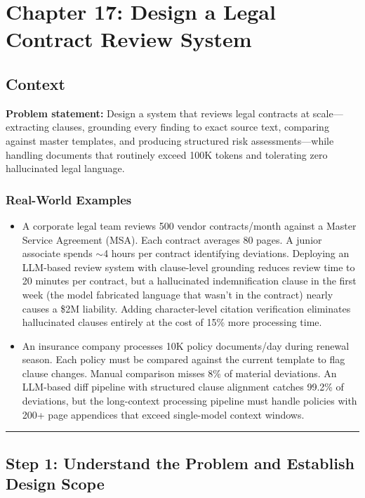 \chapter{Chapter 17: Design a Legal Contract Review System}

\section*{Context}

\textbf{Problem statement:} Design a system that reviews legal contracts at scale---extracting clauses, grounding every finding to exact source text, comparing against master templates, and producing structured risk assessments---while handling documents that routinely exceed 100K tokens and tolerating zero hallucinated legal language.

\subsection*{Real-World Examples}

\begin{itemize}
  \item A corporate legal team reviews 500 vendor contracts/month against a Master Service Agreement (MSA). Each contract averages 80 pages. A junior associate spends $\sim$4 hours per contract identifying deviations. Deploying an LLM-based review system with clause-level grounding reduces review time to 20 minutes per contract, but a hallucinated indemnification clause in the first week (the model fabricated language that wasn't in the contract) nearly causes a \$2M liability. Adding character-level citation verification eliminates hallucinated clauses entirely at the cost of 15\% more processing time.
  \item An insurance company processes 10K policy documents/day during renewal season. Each policy must be compared against the current template to flag clause changes. Manual comparison misses 8\% of material deviations. An LLM-based diff pipeline with structured clause alignment catches 99.2\% of deviations, but the long-context processing pipeline must handle policies with 200+ page appendices that exceed single-model context windows.
\end{itemize}

\bigskip\hrule\bigskip

\section*{Step 1: Understand the Problem and Establish Design Scope}

